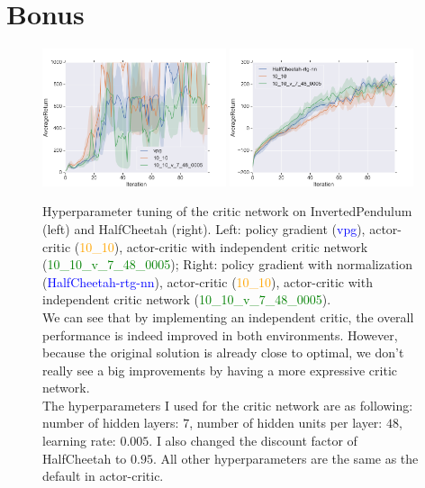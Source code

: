 \documentclass[12pt]{article}
\begin{document}
  \section{Bonus}
  \begin{figure}[!htbp]
  	\includegraphics[width=0.48\textwidth]{bonus1.png}
  	\includegraphics[width=0.48\textwidth]{bonus2.png}
  	\label{fig:bonus}
  	\caption[caption]{Hyperparameter tuning of the critic network on InvertedPendulum (left) and HalfCheetah (right).
  	Left: policy gradient (\textcolor{blue}{vpg}), actor-critic (\textcolor{orange}{10\_10}), actor-critic with independent critic network (\textcolor{green}{10\_10\_v\_7\_48\_0005});
  	Right: policy gradient with normalization (\textcolor{blue}{HalfCheetah-rtg-nn}), actor-critic (\textcolor{orange}{10\_10}), actor-critic with independent critic network (\textcolor{green}{10\_10\_v\_7\_48\_0005}).\\
  	\hspace{0.4\textwidth} 
  	We can see that by implementing an independent critic, the overall performance is indeed improved in both environments.  However, because the original solution is already close to optimal, we don't really see a big improvements by having a more expressive critic network.\\
  	\hspace{0.4\textwidth}
  	The hyperparameters I used for the critic network are as following:\\
  	\hspace{0.4\textwidth}
  	number of hidden layers: $7$, 
  	number of hidden units per layer: $48$, 
  	learning rate: $0.005$.
  	I also changed the discount factor of HalfCheetah to $0.95$.  All other hyperparameters are the same as the default in actor-critic.
  	}
  \end{figure}
\end{document}
